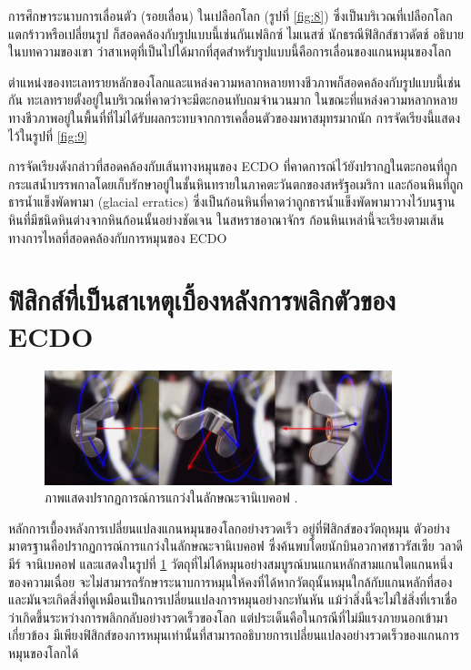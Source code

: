\documentclass[10pt,twocolumn,letterpaper]{article}
\begin{document}
การศึกษาระนาบการเลื่อนตัว (รอยเลื่อน) ในเปลือกโลก (รูปที่ \ref{fig:8}) ซึ่งเป็นบริเวณที่เปลือกโลกแตกร้าวหรือเปลี่ยนรูป ก็สอดคล้องกับรูปแบบนี้เช่นกันเฟลิกซ์ ไมเนสซ์ นักธรณีฟิสิกส์ชาวดัตช์ อธิบายในบทความของเขา \cite{36} ว่าสาเหตุที่เป็นไปได้มากที่สุดสำหรับรูปแบบนี้คือการเลื่อนของแกนหมุนของโลก

ตำแหน่งของทะเลทรายหลักของโลกและแหล่งความหลากหลายทางชีวภาพก็สอดคล้องกับรูปแบบนี้เช่นกัน ทะเลทรายตั้งอยู่ในบริเวณที่คาดว่าจะมีตะกอนทับถมจำนวนมาก ในขณะที่แหล่งความหลากหลายทางชีวภาพอยู่ในพื้นที่ที่ไม่ได้รับผลกระทบจากการเคลื่อนตัวของมหาสมุทรมากนัก \cite{28} การจัดเรียงนี้แสดงไว้ในรูปที่ \ref{fig:9}

การจัดเรียงดังกล่าวที่สอดคล้องกับเส้นทางหมุนของ ECDO ที่คาดการณ์ไว้ยังปรากฏในตะกอนที่ถูกกระแสน้ำบรรพกาลโดยเก็บรักษาอยู่ในชั้นหินทรายในภาคตะวันตกของสหรัฐอเมริกา \cite{21} และก้อนหินที่ถูกธารน้ำแข็งพัดพามา (glacial erratics) ซึ่งเป็นก้อนหินที่คาดว่าถูกธารน้ำแข็งพัดพามาวางไว้บนฐานหินที่มีชนิดหินต่างจากหินก้อนนั้นอย่างชัดเจน ในสหราชอาณาจักร ก้อนหินเหล่านี้จะเรียงตามเส้นทางการไหลที่สอดคล้องกับการหมุนของ ECDO \cite{67,68}

\section{ฟิสิกส์ที่เป็นสาเหตุเบื้องหลังการพลิกตัวของ ECDO}
\begin{figure}
\begin{center}
\includegraphics[width=0.9\textwidth]{dzhani.jpg}
\end{center}
   \caption{ภาพแสดงปรากฏการณ์การแกว่งในลักษณะจานิเบคอฟ \cite{28}.}
\label{fig:10}
\end{figure}

หลักการเบื้องหลังการเปลี่ยนแปลงแกนหมุนของโลกอย่างรวดเร็ว อยู่ที่ฟิสิกส์ของวัตถุหมุน ตัวอย่างมาตรฐานคือปรากฏการณ์การแกว่งในลักษณะจานิเบคอฟ ซึ่งค้นพบโดยนักบินอวกาศชาวรัสเซีย วลาดีมีร์ จานิเบคอฟ \cite{37} และแสดงในรูปที่ \ref{fig:10} วัตถุที่ไม่ได้หมุนอย่างสมบูรณ์บนแกนหลักสามแกนใดแกนหนึ่งของความเฉื่อย จะไม่สามารถรักษาระนาบการหมุนให้คงที่ได้หากวัตถุนั้นหมุนใกล้กับแกนหลักที่สอง และมันจะเกิดสิ่งที่ดูเหมือนเป็นการเปลี่ยนแปลงการหมุนอย่างกะทันหัน แม้ว่าสิ่งนี้จะไม่ใช่สิ่งที่เราเชื่อว่าเกิดขึ้นระหว่างการพลิกกลับอย่างรวดเร็วของโลก แต่ประเด็นคือในกรณีที่ไม่มีแรงภายนอกเข้ามาเกี่ยวข้อง มีเพียงฟิสิกส์ของการหมุนเท่านั้นที่สามารถอธิบายการเปลี่ยนแปลงอย่างรวดเร็วของแกนการหมุนของโลกได้
\end{document}
